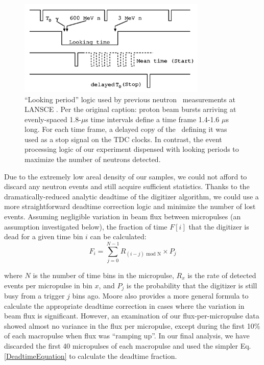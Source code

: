 \begin{figure}[tb]
    \includegraphics[width=0.8\textwidth]{figures/AnalogLogic.png}
    \caption[``Looking period'' logic from previous neutron \tot\ measurements at LANSCE]
    {
        ``Looking period'' logic used by previous neutron \tot\ measurements at LANSCE
        \cite{Abfalterer2001}. Per the original caption: proton beam bursts arriving at
        evenly-spaced 1.8-$\mu$s time intervals define a time frame 1.4-1.6 $\mu$s long. For each
        time frame, a delayed copy of the \tZero\ defining it was used as a stop signal on the TDC
    clocks. In contrast, the event processing logic of our experiment dispensed with looking 
    periods to maximize the number of neutrons detected.}
    \label{AnalogLogic}
\end{figure}

Due to the extremely low areal density of our samples,
we could not afford to discard any neutron events and still acquire sufficient statistics. 
Thanks to the dramatically-reduced analytic deadtime of the digitizer algorithm,
we could use a more straightforward deadtime correction logic and minimize the
number of lost events. Assuming negligible variation in beam flux between micropulses
(an assumption investigated below), the fraction of time $F[i]$ that the digitizer is dead 
for a given time bin $i$ can be calculated:
\begin{equation}
    F_{i} = \sum^{N-1}_{j=0} R_{(i-j)\text{ mod N}}\times P_{j}
\end{equation}

\noindent
where $N$ is the number of time bins in the micropulse, $R_{x}$ is the rate of
detected events per micropulse in bin $x$, and $P_{j}$ is the probability that the
digitizer is still busy from a trigger $j$ bins ago. Moore \cite{Moore1980} also provides
a more general 
formula to calculate the appropriate deadtime correction in cases where the variation in beam 
flux is significant. However, an examination of our flux-per-micropulse data 
showed almost no variance in the flux per micropulse, except during the first 10\%
of each macropulse when flux was ``ramping up''. In our final analysis, we have discarded the 
first 40 micropulses of each macropulse and used the simpler Eq. \ref{DeadtimeEquation} to 
calculate the deadtime fraction.

